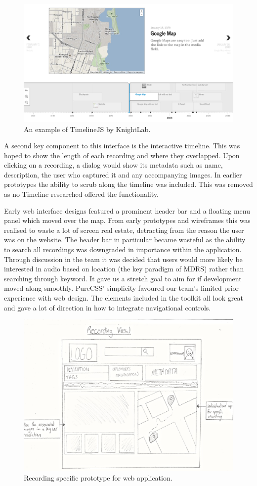 \documentclass{l3proj}
\begin{document}
\begin{figure}[ht!]
\centering
\includegraphics[width=.85\textwidth]{images/timeline-example.png}
\caption{An example of TimelineJS by KnightLab.}
\end{figure}

A second key component to this interface is the interactive timeline. This was hoped to show the length of each recording and where they overlapped. Upon clicking on a recording, a dialog would show its metadata such as name, description, the user who captured it and any accompanying images. In earlier prototypes the ability to scrub along the timeline was included. This was removed as no Timeline researched offered the functionality.

Early web interface designs featured a prominent header bar and a floating menu panel which moved over the map. From early prototypes and wireframes this was realised to waste a lot of screen real estate, detracting from the reason the user was on the website. The header bar in particular became wasteful as the ability to search all recordings was downgraded in importance within the application. Through discussion in the team it was decided that users would more likely be interested in audio based on location (the key paradigm of MDRS) rather than searching through keyword. It gave us a stretch goal to aim for if development moved along smoothly. PureCSS' simplicity favoured our team's limited prior experience with web design. The elements included in the toolkit all look great and gave a lot of direction in how to integrate navigational controls.

\begin{figure}[ht!]
\centering
\includegraphics[width=.85\textwidth]{images/web-recording-view.jpg}
\caption{Recording specific prototype for web application.}
\end{figure}
\end{document}
